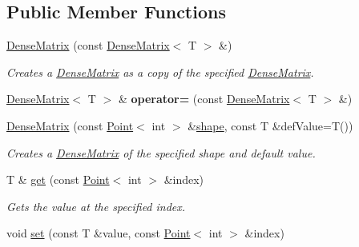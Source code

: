\subsection*{Public Member Functions}
\begin{DoxyCompactItemize}
\item 
\hypertarget{classrepast_1_1_dense_matrix_a2d5f88958be7c148ef521187a3a35844}{\hyperlink{classrepast_1_1_dense_matrix_a2d5f88958be7c148ef521187a3a35844}{Dense\-Matrix} (const \hyperlink{classrepast_1_1_dense_matrix}{Dense\-Matrix}$<$ T $>$ \&)}\label{classrepast_1_1_dense_matrix_a2d5f88958be7c148ef521187a3a35844}

\begin{DoxyCompactList}\small\item\em Creates a \hyperlink{classrepast_1_1_dense_matrix}{Dense\-Matrix} as a copy of the specified \hyperlink{classrepast_1_1_dense_matrix}{Dense\-Matrix}. \end{DoxyCompactList}\item 
\hypertarget{classrepast_1_1_dense_matrix_a7f2557ce75a717ac3aa5baa207773d7d}{\hyperlink{classrepast_1_1_dense_matrix}{Dense\-Matrix}$<$ T $>$ \& {\bfseries operator=} (const \hyperlink{classrepast_1_1_dense_matrix}{Dense\-Matrix}$<$ T $>$ \&)}\label{classrepast_1_1_dense_matrix_a7f2557ce75a717ac3aa5baa207773d7d}

\item 
\hypertarget{classrepast_1_1_dense_matrix_a4efadbfd55e04df540cdf11013325ce4}{\hyperlink{classrepast_1_1_dense_matrix_a4efadbfd55e04df540cdf11013325ce4}{Dense\-Matrix} (const \hyperlink{classrepast_1_1_point}{Point}$<$ int $>$ \&\hyperlink{classrepast_1_1_matrix_aa81d61acab94e9de748a647ed3ef535f}{shape}, const T \&def\-Value=T())}\label{classrepast_1_1_dense_matrix_a4efadbfd55e04df540cdf11013325ce4}

\begin{DoxyCompactList}\small\item\em Creates a \hyperlink{classrepast_1_1_dense_matrix}{Dense\-Matrix} of the specified shape and default value. \end{DoxyCompactList}\item 
\hypertarget{classrepast_1_1_dense_matrix_a3f98d3adca4bbf3decefc3cc676a800b}{T \& \hyperlink{classrepast_1_1_dense_matrix_a3f98d3adca4bbf3decefc3cc676a800b}{get} (const \hyperlink{classrepast_1_1_point}{Point}$<$ int $>$ \&index)}\label{classrepast_1_1_dense_matrix_a3f98d3adca4bbf3decefc3cc676a800b}

\begin{DoxyCompactList}\small\item\em Gets the value at the specified index. \end{DoxyCompactList}\item 
\hypertarget{classrepast_1_1_dense_matrix_ab9c2f06db01ab76b2682e376350c16be}{void \hyperlink{classrepast_1_1_dense_matrix_ab9c2f06db01ab76b2682e376350c16be}{set} (const T \&value, const \hyperlink{classrepast_1_1_point}{Point}$<$ int $>$ \&index)}\label{classrepast_1_1_dense_matrix_ab9c2f06db01ab76b2682e376350c16be}


\end{DoxyCompactItemize}
